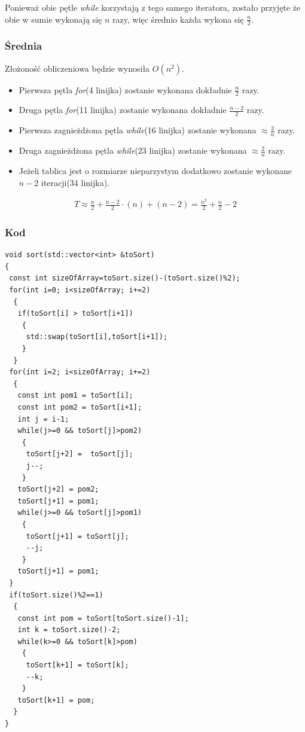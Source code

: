 Ponieważ obie pętle \textit{while} korzystają z tego samego iteratora, zostało przyjęte że obie w sumie wykonają się $n$ razy, więc średnio każda wykona się $\frac{n}{2}$.
\subsubsection*{Średnia}
Złożoność obliczeniowa będzie wynosiła $O(n^2)$.
\begin{itemize}
\item Pierwsza pętla \textit{for}(4 linijka) zostanie wykonana dokładnie $\frac{n}{2}$ razy.
\item Druga pętla \textit{for}(11 linijka) zostanie wykonana dokładnie $\frac{n-2}{2}$ razy.
\item Pierwsza zagnieżdżona pętla \textit{while}(16 linijka) zostanie wykonana $\approx \frac{2}{n}$ razy.
\item Druga zagnieżdżona pętla \textit{while}(23 linijka) zostanie wykonana $\approx \frac{2}{n}$ razy.
\item Jeżeli tablica jest o rozmiarze nieparzystym dodatkowo zostanie wykonane $n-2$ iteracji(34 linijka).
\end{itemize}
\begin{equation*}
\begin{multlined}
T \approx \frac{n}{2} + \frac{n-2}{2}\cdot(n)+ (n-2)= \frac{n^2}{2} + \frac{n}{2} -2
\end{multlined}
\end{equation*}

\wyjT
\subsubsection*{Kod}
\begin{lstlisting}[caption={Sortowanie przez wstawianie dla par},label={lst:wstawianie}]
void sort(std::vector<int> &toSort)
{
 const int sizeOfArray=toSort.size()-(toSort.size()%2);
 for(int i=0; i<sizeOfArray; i+=2)
  {
   if(toSort[i] > toSort[i+1])
    {
     std::swap(toSort[i],toSort[i+1]);
    }
  }
 for(int i=2; i<sizeOfArray; i+=2)
  {
   const int pom1 = toSort[i];
   const int pom2 = toSort[i+1];
   int j = i-1;
   while(j>=0 && toSort[j]>pom2)
    {
     toSort[j+2] =  toSort[j];
     j--;
    }
   toSort[j+2] = pom2;
   toSort[j+1] = pom1;
   while(j>=0 && toSort[j]>pom1)
    {
     toSort[j+1] = toSort[j];
     --j;
    }
   toSort[j+1] = pom1;
 }
 if(toSort.size()%2==1)
  {
   const int pom = toSort[toSort.size()-1];
   int k = toSort.size()-2;
   while(k>=0 && toSort[k]>pom)
    {
     toSort[k+1] = toSort[k];
     --k;
    }
   toSort[k+1] = pom;
  }
}
\end{lstlisting}

